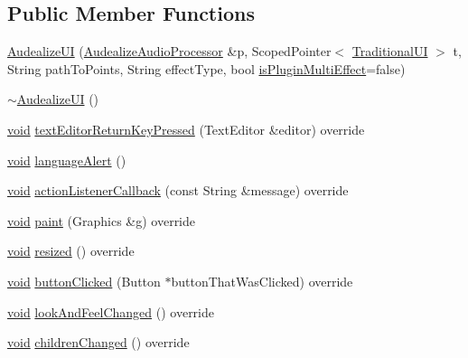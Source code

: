 \subsection*{Public Member Functions}
\begin{DoxyCompactItemize}
\item 
\hyperlink{class_audealize_1_1_audealize_u_i_a5200044a18f6357b4b218e2e4d10fcce}{Audealize\+UI} (\hyperlink{class_audealize_1_1_audealize_audio_processor}{Audealize\+Audio\+Processor} \&p, Scoped\+Pointer$<$ \hyperlink{class_audealize_1_1_traditional_u_i}{Traditional\+UI} $>$ t, String path\+To\+Points, String effect\+Type, bool \hyperlink{class_audealize_1_1_audealize_u_i_ac5cfa0dc74706b4df821f7addfcc108d}{is\+Plugin\+Multi\+Effect}=false)
\item 
\hyperlink{class_audealize_1_1_audealize_u_i_a77d239387e49d6e032f434f15f4631e0}{$\sim$\+Audealize\+UI} ()
\item 
\hyperlink{tk_8h_aba408b7cd755a96426e004c015f5de8e}{void} \hyperlink{class_audealize_1_1_audealize_u_i_a6f5f606a15f0e656af570de10172c690}{text\+Editor\+Return\+Key\+Pressed} (Text\+Editor \&editor) override
\item 
\hyperlink{tk_8h_aba408b7cd755a96426e004c015f5de8e}{void} \hyperlink{class_audealize_1_1_audealize_u_i_a11662118bb8a50472f486fee23e81a14}{language\+Alert} ()
\item 
\hyperlink{tk_8h_aba408b7cd755a96426e004c015f5de8e}{void} \hyperlink{class_audealize_1_1_audealize_u_i_a886ff0e83c14fc96b469d4764f820791}{action\+Listener\+Callback} (const String \&message) override
\item 
\hyperlink{tk_8h_aba408b7cd755a96426e004c015f5de8e}{void} \hyperlink{class_audealize_1_1_audealize_u_i_aeaf15fc6ba8e3f536fa627a1c80b2c64}{paint} (Graphics \&g) override
\item 
\hyperlink{tk_8h_aba408b7cd755a96426e004c015f5de8e}{void} \hyperlink{class_audealize_1_1_audealize_u_i_a76ddb32329ed8550dc8b9bbbf44fb50d}{resized} () override
\item 
\hyperlink{tk_8h_aba408b7cd755a96426e004c015f5de8e}{void} \hyperlink{class_audealize_1_1_audealize_u_i_a2d29f30e6b9dc0d7012c58e4a5e3a84e}{button\+Clicked} (Button $\ast$button\+That\+Was\+Clicked) override
\item 
\hyperlink{tk_8h_aba408b7cd755a96426e004c015f5de8e}{void} \hyperlink{class_audealize_1_1_audealize_u_i_a0949b75681b58a8ca6063a6c1f56ca92}{look\+And\+Feel\+Changed} () override
\item 
\hyperlink{tk_8h_aba408b7cd755a96426e004c015f5de8e}{void} \hyperlink{class_audealize_1_1_audealize_u_i_ab56c907e41ba7bdd871c0aceccf0b60e}{children\+Changed} () override

\end{DoxyCompactItemize}
